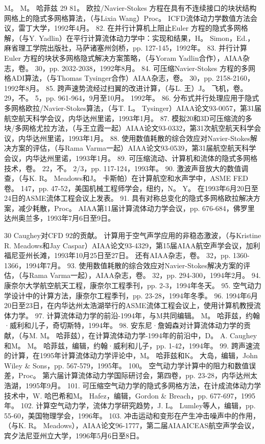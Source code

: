 \documentclass[UTF8,11pt,a4paper,openany,fontset=fandol]{ctexbook}
\begin{document}
M。 M。 哈菲兹 29 81。 欧拉/Navier-Stokes 方程在具有不连续接口的块状结构网格上的隐式多网格算法，（与Lixia Wang）Proc。 ICFD流体动力学数值方法会议，雷丁大学，1992年4月。 82. 在并行计算机上阻止Euler 方程的隐式多网格解，（与Y. Yadlin）在平行计算流体动力学中：实现和结果，H。 Simon，Ed.，麻省理工学院出版社，马萨诸塞州剑桥，pp. 127-145，1992年。 83. 并行计算 Euler 方程的块状多网格隐式解决方案策略，（与Yoram Yadlin合作），AIAA杂志，卷。 30，pp. 2032-2038，1992年8月。 84. 可压缩Navier-Stokes 方程的多网格ADI算法，（与Thomas Tysinger合作）AIAA杂志，卷。 30，pp. 2158-2160，1992年8月。 85. 跨声速势流经过扫翼的改进计算，（与L. 王）J。 飞机，卷。 29，不。 5，pp. 961-964，9月至10月。 1992年。 86. 分布式并行处理应用于隐式多网格欧拉/Navier-Stokes算法，（与T. L。 Tysinger）AIAA论文93-0057，第31届航空航天科学会议，内华达州里诺，1993年1月。 87. 模拟20和3D可压缩流的多块/多网格尤拉方法，（与王立霞一起）AIAA论文93-0332，第31次航空航天科学会议，内华达州里诺，1993年1月。 88. 使用数值耗散的综合效应对Navier-Stokes解决方案的评估，（与Rama Varma一起）AIAA论文93-0539，第31届航空航天科学会议，内华达州里诺，1993年1月。 89. 可压缩流动、计算机和流体的隐式多网格技术，卷。 22，不。 2/3，pp. 117-124，1993年。 90. 激波声音放大的数值调查，（与K. R。 Meadows和J。 卡斯帕）在计算航空和水声学中，ASME FED卷。 147，pp. 47-52，美国机械工程师学会，纽约，N。 Y。 在1993年6月20日至24日的ASME流体工程会议上发表。 91. 具有对称总变化的隐式多网格欧拉解决方案，减少耗散，Proc。 AIAA第11届计算流体动力学会议，pp. 676-684，佛罗里达州奥兰多，1993年7月6日至9日。

30 Caughey对CFD 92的贡献。 计算用于空气声学应用的非稳态激波，（与Kristine R. Meadows和Jay Caspar）AIAA论文93-4329，第15届AIAA航空声学会议，加利福尼亚州长滩，1993年10月25日至27日。 还有AIAA杂志，卷。 32，pp. 1360-1366，1994年7月。 93. 使用数值耗散的综合效应对Navier-Stokes解决方案的评估，（与Rama Varma一起），AIAA杂志，卷。 32，pp. 294-300，1994年2月。 94. 康奈尔大学航空航天工程，康奈尔工程季刊，pp. 2-3，1994年冬天。 95. 空气动力学设计中的计算方法，康奈尔工程季刊，pp. 23-28，1994年冬季。 96. 1994年6月20日至23日，在内华达州太浩湖举行的ASME流体工程会议上，使用计算机教授流体力学。 97. 计算流体动力学的前沿-1994年，与M共同编辑。 M。 哈菲兹，约翰·威利和儿子，奇切斯特，1994年。 98. 安东尼·詹姆森对计算流体动力学的贡献，（与M. M。 哈菲兹），在计算流体动力学-1994年的前沿中，D。 A. Caughey和M。 M。 哈菲兹，编辑，约翰·威利和儿子，pp. 1-42，1994年。 99. 跨声速流的计算，在1995年计算流体动力学评论中，M。 哈菲兹和K。 大岛，编辑，John Wiley \& Sons，pp. 567-579，1995年。 100。 空气动力学计算中的阻力和数值误差，Proc。 第六届计算流体动力学国际研讨会，第四卷，pp. 23-28，内华达州太浩湖，1995年9月。 101. 可压缩空气动力学的隐式多网格方法，在计成流体动力学技术中，W. 哈巴希和M。 Hafez，编辑，Gordon \& Breach，pp. 677-697，1995年。 102. 计算空气动力学，流体力学研究趋势，J. L。 Lumley等人，编辑，pp. 55-60，美国物理学会，1996年。 103. 冲击运动和变形在产生冲击噪声中的作用，（与K. R。 Meadows），AIAA论文96-1777，第二届AIAAICEAS航空声学会议，宾夕法尼亚州立大学，1996年5月6日至8日。
\end{document}
